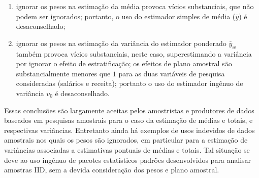 \documentclass[]{book}
\theoremstyle{definition}
\theoremstyle{definition}
\theoremstyle{definition}
\theoremstyle{remark}
\begin{document}
\begin{enumerate}
\def\labelenumi{\arabic{enumi}.}
\item
  ignorar os pesos na estimação da média provoca vícios substanciais,
  que não podem ser ignorados; portanto, o uso do estimador simples de
  média (\(\bar{y}\)) é desaconselhado;
\item
  ignorar os pesos na estimação da variância do estimador ponderado
  \(\bar{y}_{w}\) também provoca vícios substanciais, neste caso,
  superestimando a variância por ignorar o efeito de estratificação; os
  efeitos de plano amostral são substancialmente menores que \(1\) para
  as duas variáveis de pesquisa consideradas (salários e receita);
  portanto o uso do estimador ingênuo de variância \(v_{0}\) é
  desaconselhado.
\end{enumerate}

Essas conclusões são largamente aceitas pelos amostristas e produtores
de dados baseados em pesquisas amostrais para o caso da estimação de
médias e totais, e respectivas variâncias. Entretanto ainda há exemplos
de usos indevidos de dados amostrais nos quais os pesos são ignorados,
em particular para a estimação de variâncias associadas a estimativas
pontuais de médias e totais. Tal situação se deve ao uso ingênuo de
pacotes estatísticos padrões desenvolvidos para analisar amostras IID,
sem a devida consideração dos pesos e plano amostral.
\end{document}
